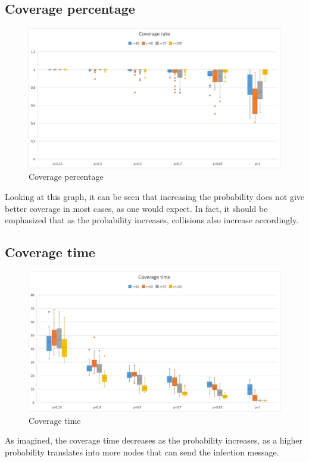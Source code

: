 \subsection{Coverage percentage}
\begin{figure}[h!]
\centering
    \includegraphics[width= 1\textwidth]{./images/Rate200Boxplot.png}
    \caption{Coverage percentage}
    \label{fig:coverage-percentage}
\end{figure}

\noindent Looking at this graph, it can be seen that increasing the probability does not give better coverage in most cases, as one would expect. In fact, it should be emphasized that as the probability increases, collisions also increase accordingly.

\subsection{Coverage time}
\begin{figure}
\centering
    \includegraphics[width= 1\textwidth]{./images/Time200Boxplot.png}
    \caption{Coverage time}
    \label{fig:coverage-time}
\end{figure}
\noindent As imagined, the coverage time decreases as the probability increases, as a higher probability translates into more nodes that can send the infection message.

